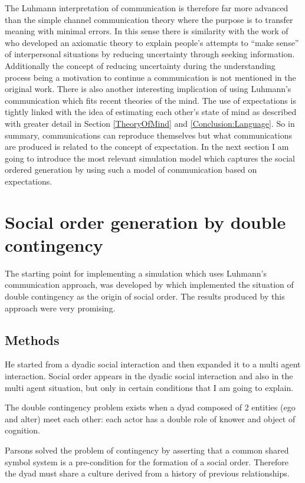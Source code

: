 The Luhmann interpretation of communication is therefore far more advanced
than the simple channel communication theory where the purpose is to transfer
meaning with minimal errors.
In this sense there is similarity with the work of \citep{Berger1975:URT} 
who developed an axiomatic theory to explain people's attempts to “make sense” of interpersonal
situations by reducing uncertainty through seeking information.
Additionally the concept of reducing uncertainty
during the understanding process being a motivation to continue a communication 
is not mentioned in the original work.
There is also another interesting implication of using Luhmann's communication 
which fits recent theories of the mind.
The use of expectations is tightly linked with the idea of estimating each other's
state of mind as described with greater detail in Section \ref{TheoryOfMind} and \ref{Conclusion:Language}.
So in summary, communications can reproduce themselves but what communications
are produced is related to the concept of expectation.
In the next section I am going to introduce the most relevant simulation model 
which captures the social ordered generation by using such a model of communication 
based on expectations.

\section{Social order generation by double contingency \label{Introduction:SocialOrderModel}}

The starting point for implementing a simulation which uses Luhmann's communication approach, 
was developed by \citet{SocialOrderScalability} which implemented the situation of
double contingency as the origin of social order.
The results produced by this approach were very promising.


\subsection{Methods}
He started from a dyadic social interaction and then expanded it to a multi agent interaction.
Social order appears in the dyadic social interaction and also in the multi agent situation,
but only in certain conditions that I am going to explain.

The double contingency problem exists when a dyad composed of 2 entities (ego and alter) meet each other:
each actor has a double role of knower and object of cognition.

Parsons solved the problem of contingency by asserting that a common shared symbol system
is a pre-condition for the formation of a social order.
Therefore the dyad must share a culture derived from a history of previous relationships.

